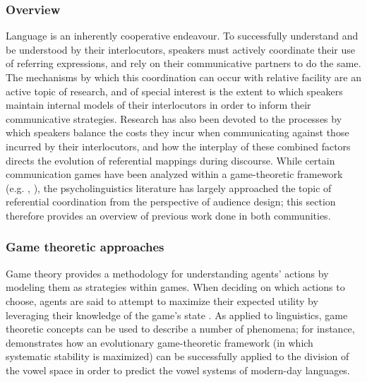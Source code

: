 \documentclass[12pt,a4paper]{article}
\begin{document}
\subsubsection{Overview}
Language is an inherently cooperative endeavour. To successfully understand and be understood by their interlocutors, speakers must actively coordinate their use of referring expressions, and rely on their communicative partners to do the same. The mechanisms by which this coordination can occur with relative facility are an active topic of research, and of special interest is the extent to which speakers maintain internal models of their interlocutors in order to inform their communicative strategies. Research has also been devoted to the processes by which speakers balance the costs they incur when communicating against those incurred by their interlocutors, and how the interplay of these combined factors directs the evolution of referential mappings during discourse. While certain communication games have been analyzed within a game-theoretic framework (e.g. \citeauthor{rohde2012} \citeyear{rohde2012}, \citeauthor{degen2012} \citeyear{degen2012}), the psycholinguistics literature has largely approached the topic of referential coordination from the perspective of audience design; this section therefore provides an overview of previous work done in both communities.

\subsubsection{Game theoretic approaches}
Game theory provides a methodology for understanding agents' actions by modeling them as strategies within games. When deciding on which actions to choose, agents are said to attempt to maximize their expected utility by leveraging their knowledge of the game's state \citep{benz2005}. As applied to linguistics, game theoretic concepts can be used to describe a number of phenomena; for instance, \cite{jaeger2008} demonstrates how an evolutionary game-theoretic framework (in which systematic stability is maximized) can be successfully applied to the division of the vowel space in order to predict the vowel systems of modern-day languages.
\end{document}
